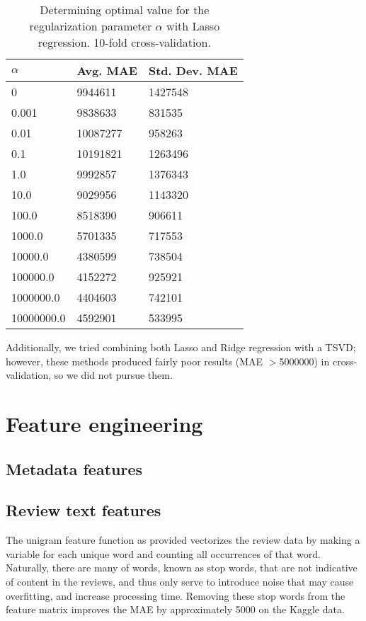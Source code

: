 \documentclass[11pt]{amsart}
\begin{document}
\begin{table}[h]
\begin{tabular}{@{}lll@{}}
\toprule
$\alpha$ & Avg. MAE & Std. Dev. MAE \\ \midrule
  0  & 9944611   & 1427548 \\
                0.001  & 9838633   & 831535  \\
                 0.01  & 10087277  & 958263  \\
                  0.1  & 10191821  & 1263496 \\
                  1.0  & 9992857   & 1376343 \\
                 10.0  & 9029956   & 1143320 \\
                100.0  & 8518390   & 906611  \\
               1000.0  & 5701335   & 717553  \\
              10000.0  & 4380599   & 738504  \\
             100000.0  & 4152272   & 925921  \\
            1000000.0  & 4404603   & 742101  \\
           10000000.0  & 4592901   & 533995  \\\bottomrule
\end{tabular}
\caption{Determining optimal value for the regularization parameter $\alpha$ with Lasso regression. 10-fold cross-validation.}
\end{table}

Additionally, we tried combining both Lasso and Ridge regression with a TSVD; however, these methods produced fairly poor results (MAE $>$5000000) in cross-validation, so we did not pursue them.

\section{Feature engineering}

\subsection{Metadata features}

\subsection{Review text features}
The unigram feature function as provided vectorizes the review data by making a variable for each unique word and counting all occurrences of that word. Naturally, there are many of words, known as stop words, that are not indicative of content in the reviews, and thus only serve to introduce noise that may cause overfitting, and increase processing time. Removing these stop words from the feature matrix improves the MAE by approximately 5000 on the Kaggle data.
\end{document}
